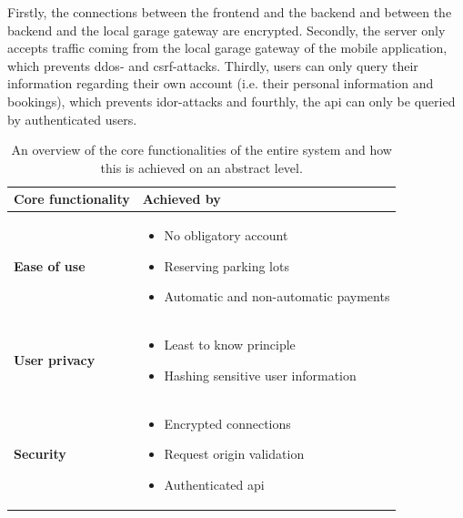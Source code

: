 \ind Firstly, the connections between the frontend and the backend and between the backend and the local garage gateway are encrypted. Secondly, the server only accepts traffic coming from the local garage gateway of the mobile application, which prevents \ac{ddos}- and \ac{csrf}-attacks. Thirdly, users can only query their information regarding their own account (i.e. their personal information and bookings), which prevents \ac{idor}-attacks and fourthly, the \ac{api} can only be queried by authenticated users.

\begin{table}[htp]
    \centering
    \caption{An overview of the core functionalities of the entire system and how this is achieved on an abstract level. }
    \begin{tabular}{|>{\bfseries\centering\arraybackslash}m{1in}|>{\centering\arraybackslash}m{8cm}|}
         \hline
         \textbf{Core functionality} & \textbf{Achieved by}  \\
         \hline
         \hline
         Ease of use & \begin{itemize}[left=0pt]
             \item No obligatory account
             \item Reserving parking lots
             \item Automatic and non-automatic payments
         \end{itemize} \\
         \hline
         User privacy & \begin{itemize}[left=0pt]
             \item Least to know principle
             \item Hashing sensitive user information
         \end{itemize}\\
         \hline
         Security &\begin{itemize}[left=0pt]
             \item Encrypted connections
             \item Request origin validation
             \item Authenticated \ac{api}
         \end{itemize} \\
         \hline
    \end{tabular}
    \label{tab:core-functionalities}
\end{table}
